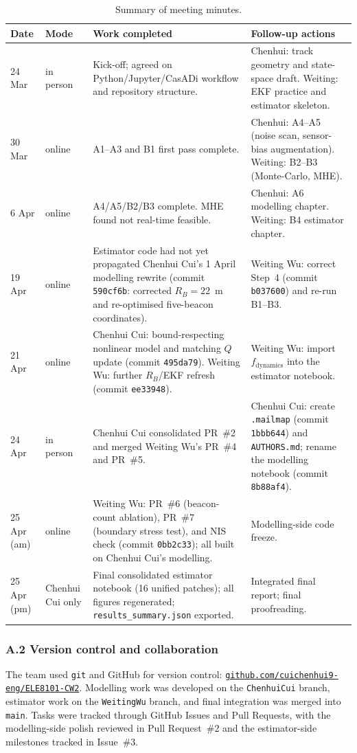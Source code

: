 \documentclass[11pt,a4paper]{article}
\renewcommand{\arraystretch}{1.15} %
\newcommand{\code}[1]{\texttt{#1}}
\begin{document}
\begin{table}[H]
\centering
\footnotesize
\caption{Summary of meeting minutes.}
\label{tab:minutes}
\renewcommand{\arraystretch}{1.2}
\begin{tabular}{|p{1.4cm}|p{2.1cm}|p{4.2cm}|p{5.8cm}|}
\hline
\textbf{Date} & \textbf{Mode} & \textbf{Work completed} &
\textbf{Follow-up actions}\\
\hline
24 Mar & in person &
Kick-off; agreed on Python/Jupyter/CasADi workflow and repository
structure. &
Chenhui: track geometry and state-space draft.
Weiting: EKF practice and estimator skeleton.\\
\hline
30 Mar & online &
A1--A3 and B1 first pass complete. &
Chenhui: A4--A5 (noise scan, sensor-bias augmentation).
Weiting: B2--B3 (Monte-Carlo, MHE).\\
\hline
6 Apr & online &
A4/A5/B2/B3 complete. MHE found not real-time feasible. &
Chenhui: A6 modelling chapter.
Weiting: B4 estimator chapter.\\
\hline
19 Apr & online &
Estimator code had not yet propagated Chenhui Cui's 1 April
modelling rewrite (commit \texttt{590cf6b}: corrected
$R_B=22$~m and re-optimised five-beacon coordinates). &
Weiting Wu: correct Step~4 (commit \texttt{b037600})
and re-run B1--B3.\\
\hline
21 Apr & online &
Chenhui Cui: bound-respecting nonlinear model and matching
$Q$ update (commit \texttt{495da79}).
Weiting Wu: further $R_B$/EKF refresh (commit \texttt{ee33948}). &
Weiting Wu: import $f_{\mathrm{dynamics}}$ into the estimator
notebook.\\
\hline
24 Apr & in person &
Chenhui Cui consolidated PR~\#2 and merged Weiting Wu's PR~\#4
and PR~\#5. &
Chenhui Cui: create \texttt{.mailmap} (commit \texttt{1bbb644}) and
\texttt{AUTHORS.md}; rename the modelling notebook
(commit \texttt{8b88af4}).\\
\hline
25 Apr (am) & online &
Weiting Wu: PR~\#6 (beacon-count ablation), PR~\#7 (boundary
stress test), and NIS check (commit \texttt{0bb2c33}); all built on
Chenhui Cui's modelling. &
Modelling-side code freeze.\\
\hline
25 Apr (pm) & Chenhui Cui only &
Final consolidated estimator notebook (16 unified patches); all
figures regenerated; \code{results\_summary.json} exported. &
Integrated final report; final proofreading.\\
\hline
\end{tabular}
\end{table}

\subsubsection*{A.2 Version control and collaboration}
The team used \texttt{git} and GitHub for version control:
\href{https://github.com/cuichenhui9-eng/ELE8101-CW2}{\texttt{github.com/cuichenhui9-eng/ELE8101-CW2}}.
Modelling work was developed on the \texttt{ChenhuiCui} branch,
estimator work on the \texttt{WeitingWu} branch, and final integration
was merged into \texttt{main}. Tasks were tracked through GitHub
Issues and Pull Requests, with the modelling-side polish reviewed in
Pull Request~\#2 and the estimator-side milestones tracked in
Issue~\#3.
\end{document}
